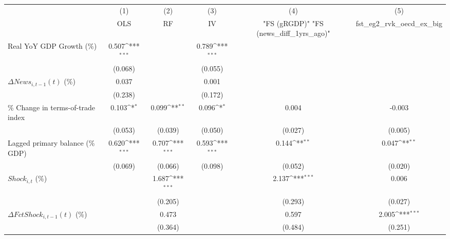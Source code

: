 {
\def\sym#1{\ifmmode^{#1}\else\(^{#1}\)\fi}
\begin{tabular}{l*{5}{c}}
\toprule
                    &\multicolumn{1}{c}{(1)}&\multicolumn{1}{c}{(2)}&\multicolumn{1}{c}{(3)}&\multicolumn{1}{c}{(4)}&\multicolumn{1}{c}{(5)}\\
                    &\multicolumn{1}{c}{OLS}&\multicolumn{1}{c}{RF}&\multicolumn{1}{c}{IV}&\multicolumn{1}{c}{ "FS (gRGDP)"  "FS (news_diff_1yrs_ago)" }&\multicolumn{1}{c}{fst_eg2_rvk_oecd_ex_big}\\
\midrule
Real YoY GDP Growth (\%)&       0.507\sym{***}&                     &       0.789\sym{***}&                     &                     \\
                    &     (0.068)         &                     &     (0.055)         &                     &                     \\
\addlinespace
$ \Delta News_{i,t-1}(t)$ (\%)&       0.037         &                     &       0.001         &                     &                     \\
                    &     (0.238)         &                     &     (0.172)         &                     &                     \\
\addlinespace
\% Change in terms-of-trade index&       0.103\sym{*}  &       0.099\sym{**} &       0.096\sym{*}  &       0.004         &      -0.003         \\
                    &     (0.053)         &     (0.039)         &     (0.050)         &     (0.027)         &     (0.005)         \\
\addlinespace
Lagged primary balance (\% GDP)&       0.620\sym{***}&       0.707\sym{***}&       0.593\sym{***}&       0.144\sym{**} &       0.047\sym{**} \\
                    &     (0.069)         &     (0.066)         &     (0.098)         &     (0.052)         &     (0.020)         \\
\addlinespace
$ Shock_{i,t}$ (\%) &                     &       1.687\sym{***}&                     &       2.137\sym{***}&       0.006         \\
                    &                     &     (0.205)         &                     &     (0.293)         &     (0.027)         \\
\addlinespace
$ \Delta FctShock_{i,t-1}(t)$ (\%)&                     &       0.473         &                     &       0.597         &       2.005\sym{***}\\
                    &                     &     (0.364)         &                     &     (0.484)         &     (0.251)         \\

\end{tabular}}

